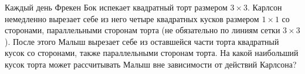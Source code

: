 Каждый день Фрекен Бок испекает квадратный торт размером $3 \times 3$. Карлсон немедленно вырезает себе из него четыре квадратных кусков размером $1 \times 1$ со сторонами, параллельными сторонам торта (не обязательно по линиям сетки $3 \times 3$). После этого Малыш вырезает себе из оставшейся части торта квадратный кусок со сторонами, также параллельными сторонам торта. На какой наибольший кусок торта может рассчитывать Малыш вне зависимости от действий Карлсона?